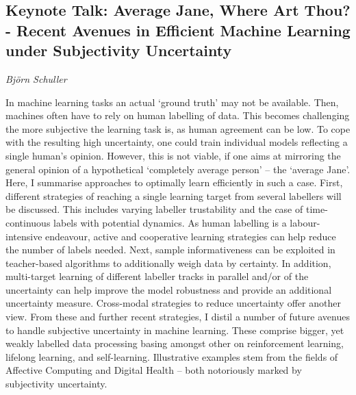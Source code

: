 \documentclass[../booklet.tex]{subfiles}
\begin{document}
\subsection[Keynote Talk: Average Jane, Where Art Thou? - Recent Avenues in Efficient Machine Learning under Subjectivity Uncertainty. {\it Björn Schuller}]{Keynote Talk: Average Jane, Where Art Thou? - Recent Avenues in Efficient Machine Learning under Subjectivity Uncertainty}

\begin{center}
  {\it Björn Schuller}
\end{center}



In machine learning tasks an actual `ground truth' may not be available. Then, machines often have to rely on human labelling of data. This becomes challenging the more subjective the learning task is, as human agreement can be low. To cope with the resulting high uncertainty, one could train individual models reflecting a single human's opinion. However, this is not viable, if one aims at mirroring the general opinion of a hypothetical `completely average person' -- the `average Jane'. Here, I summarise approaches to optimally learn efficiently in such a case. First, different strategies of reaching a single learning target from several labellers will be discussed. This includes varying labeller trustability and the case of time-continuous labels with potential dynamics. As human labelling is a labour-intensive endeavour, active and cooperative learning strategies can help reduce the number of labels needed. Next, sample informativeness can be exploited in teacher-based algorithms to additionally weigh data by certainty. In addition, multi-target learning of different labeller tracks in parallel and/or of the uncertainty can help improve the model robustness and provide an additional uncertainty measure. Cross-modal strategies to reduce uncertainty offer another view. From these and further recent strategies, I distil a number of future avenues to handle subjective uncertainty in machine learning. These comprise bigger, yet weakly labelled data processing basing amongst other on reinforcement learning, lifelong learning, and self-learning. Illustrative examples stem from the fields of Affective Computing and Digital Health -- both notoriously marked by subjectivity uncertainty.

% 
\end{document}
